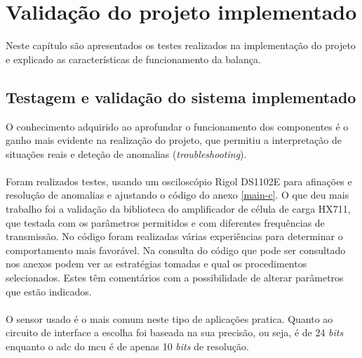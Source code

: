 \chapter{Validação do projeto implementado}
Neste capítulo são apresentados os testes realizados na implementação do projeto e explicado as características de funcionamento da balança.
\section{Testagem e validação do sistema implementado}
O conhecimento adquirido ao aprofundar o funcionamento dos componentes é o ganho mais evidente na realização do projeto, que permitiu a interpretação de situações reais e deteção de anomalias (\textit{troubleshooting}).
\\
\\
Foram realizados testes, usando um osciloscópio Rigol DS1102E para afinações e resolução de anomalias e ajustando o código do anexo \ref{main-c}. O que deu mais trabalho foi a validação da biblioteca do amplificador de célula de carga HX711, que testada com os parâmetros permitidos e com diferentes frequências de transmissão. No código foram realizadas várias experiências para determinar o comportamento mais favorável. Na consulta do código que pode ser consultado nos anexos podem ver as estratégias tomadas e qual os procedimentos selecionados. Estes têm comentários com a possibilidade de alterar parâmetros que estão indicados.
\\
\\
O sensor usado é o mais comum neste tipo de aplicações pratica. Quanto ao circuito de interface a escolha foi baseada na sua precisão, ou seja, é de 24 \textit{bits} enquanto o \acs{adc} do \acs{mcu} é de apenas 10 \textit{bits} de resolução.
